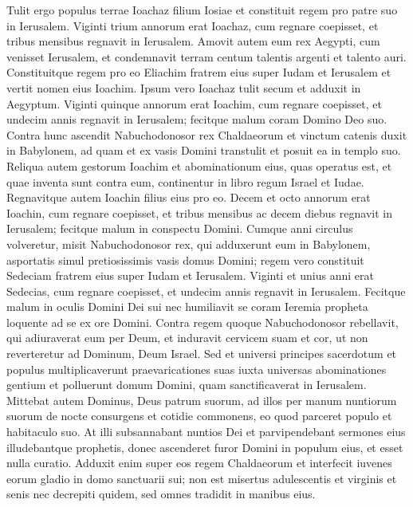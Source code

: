 \begin{biblechapter}  
\verse Tulit ergo populus terrae Ioachaz filium Iosiae et constituit regem pro patre suo in Ierusalem. 
\verse Viginti trium annorum erat Ioachaz, cum regnare coepisset, et tribus mensibus regnavit in Ierusalem. 
\verse Amovit autem eum rex Aegypti, cum venisset Ierusalem, et condemnavit terram centum talentis argenti et talento auri. 
\verse Constituitque regem pro eo Eliachim fratrem eius super Iudam et Ierusalem et vertit nomen eius Ioachim. Ipsum vero Ioachaz tulit secum et adduxit in Aegyptum. 
\verse Viginti quinque annorum erat Ioachim, cum regnare coepisset, et undecim annis regnavit in Ierusalem; fecitque malum coram Domino Deo suo. 
\verse Contra hunc ascendit Nabuchodonosor rex Chaldaeorum et vinctum catenis duxit in Babylonem,  
\verse ad quam et ex vasis Domini transtulit et posuit ea in templo suo. 
\verse Reliqua autem gestorum Ioachim et abominationum eius, quas operatus est, et quae inventa sunt contra eum, continentur in libro regum Israel et Iudae. Regnavitque autem Ioachin filius eius pro eo. 
\verse Decem et octo annorum erat Ioachin, cum regnare coepisset, et tribus mensibus ac decem diebus regnavit in Ierusalem; fecitque malum in conspectu Domini.  
\verse Cumque anni circulus volveretur, misit Nabuchodonosor rex, qui adduxerunt eum in Babylonem, asportatis simul pretiosissimis vasis domus Domini; regem vero constituit Sedeciam fratrem eius super Iudam et Ierusalem. 
\verse Viginti et unius anni erat Sedecias, cum regnare coepisset, et undecim annis regnavit in Ierusalem. 
\verse Fecitque malum in oculis Domini Dei sui nec humiliavit se coram Ieremia propheta loquente ad se ex ore Domini. 
\verse Contra regem quoque Nabuchodonosor rebellavit, qui adiuraverat eum per Deum, et induravit cervicem suam et cor, ut non reverteretur ad Dominum, Deum Israel. 
\verse Sed et universi principes sacerdotum et populus multiplicaverunt praevaricationes suas iuxta universas abominationes gentium et polluerunt domum Domini, quam sanctificaverat in Ierusalem. 
\verse Mittebat autem Dominus, Deus patrum suorum, ad illos per manum nuntiorum suorum de nocte consurgens et cotidie commonens, eo quod parceret populo et habitaculo suo. 
\verse At illi subsannabant nuntios Dei et parvipendebant sermones eius illudebantque prophetis, donec ascenderet furor Domini in populum eius, et esset nulla curatio. 
\verse Adduxit enim super eos regem Chaldaeorum et interfecit iuvenes eorum gladio in domo sanctuarii sui; non est misertus adulescentis et virginis et senis nec decrepiti quidem, sed omnes tradidit in manibus eius. 

\end{biblechapter}
